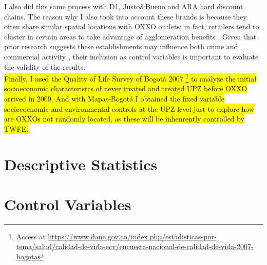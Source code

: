 \documentclass[12pt]{article}
\begin{document}
I also did this same process with D1, Justo\&Bueno and ARA hard discount chains. The reason why I also took into account these brands is because they often share similar spatial locations with OXXO outlets; in fact, retailers tend to cluster in certain areas to take advantage of agglomeration benefits \parencite{Konishi2005, Seong2022}. 
Given that prior research suggests these establishments may influence both crime and commercial activity \parencite{delgado2024, jaramillo2021low}, their inclusion as control variables is important to evaluate the validity of the results.\\

\hl{Finally, I used the Quality of Life Survey of Bogotá 2007 \footnote{Access at \url{https://www.dane.gov.co/index.php/estadisticas-por-tema/salud/calidad-de-vida-ecv/encuesta-nacional-de-calidad-de-vida-2007-bogota}} to analyze the initial socioeconomic characteristcs of never treated and treated UPZ before OXXO arrived in 2009. 
And with Mapas-Bogotá I obtained the fixed variable socioeocnomic and environmental controls at the UPZ level just to explore how are OXXOs not randomly located, as these will be inhenrently controlled by TWFE.}

\section{Descriptive Statistics} 


\section{Control Variables}
\end{document}
